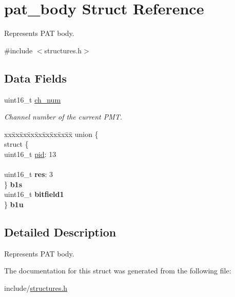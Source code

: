 \hypertarget{structpat__body}{}\section{pat\+\_\+body Struct Reference}
\label{structpat__body}


Represents P\+AT body.  




{\ttfamily \#include $<$structures.\+h$>$}

\subsection*{Data Fields}
\begin{DoxyCompactItemize}
\item 
uint16\+\_\+t \hyperlink{structpat__body_a598606f66a60d2c844b39a335f2ae568}{ch\+\_\+num}\hypertarget{structpat__body_a598606f66a60d2c844b39a335f2ae568}{}\label{structpat__body_a598606f66a60d2c844b39a335f2ae568}

\begin{DoxyCompactList}\small\item\em Channel number of the current P\+MT. \end{DoxyCompactList}\item 
\begin{tabbing}
xx\=xx\=xx\=xx\=xx\=xx\=xx\=xx\=xx\=\kill
union \{\\
\>struct \{\\
\>\>uint16\_t \hyperlink{structpat__body_ac6a89b300683b8445324a9609ce01c3d}{pid}: 13\\
\>\>\\
\>\>uint16\_t {\bfseries res}: 3\\
\>\} {\bfseries b1s}\\
\>uint16\_t {\bfseries bitfield1}\\
\} {\bfseries b1u}\hypertarget{structpat__body_a8f3a02c9dcdbc8c2943c2138a5db6d5f}{}\label{structpat__body_a8f3a02c9dcdbc8c2943c2138a5db6d5f}
\\

\end{tabbing}\end{DoxyCompactItemize}


\subsection{Detailed Description}
Represents P\+AT body. 

The documentation for this struct was generated from the following file\+:\begin{DoxyCompactItemize}
\item 
include/\hyperlink{structures_8h}{structures.\+h}\end{DoxyCompactItemize}
